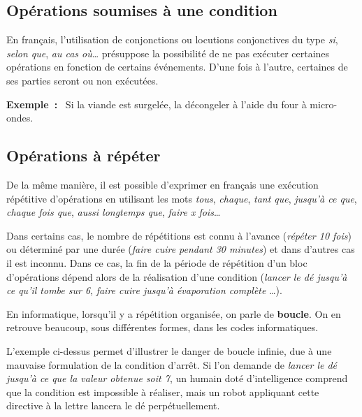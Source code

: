 		\subsection{Opérations soumises à une condition}
		
			En français, 
			l’utilisation de conjonctions ou locutions conjonctives 
			du type \textit{si}, \textit{selon que}, \textit{au cas où}\dots{}
			présuppose la possibilité 
			de ne pas exécuter certaines opérations 
			en fonction de certains événements. 
			D’une fois à l’autre, 
			certaines de ses parties seront ou non exécutées.
			
			\textbf{Exemple~:}~
			Si la viande est surgelée, 
			la décongeler à l’aide du four à micro-ondes.
	
		\subsection{Opérations à répéter}
		
			De la même manière, 
			il est possible d’exprimer en français une exécution
			répétitive d’opérations en utilisant les mots \textit{tous},
			\textit{chaque}, \textit{tant que}, \textit{jusqu’à ce que},
			\textit{chaque fois que}, \textit{aussi longtemps que}, 
			\textit{faire x fois}\dots 
			
			Dans certains cas, 
			le nombre de répétitions est connu à l’avance
			(\textit{répéter 10 fois}) 
			ou déterminé par une durée 
			(\textit{faire cuire pendant 30 minutes}) 
			et dans d’autres cas il est inconnu.
			Dans ce cas, la fin de la période de répétition 
			d’un bloc d’opérations dépend alors 
			de la réalisation d’une condition 
			(\textit{lancer le dé jusqu’à ce qu’il tombe sur 6}, 
			\textit{faire cuire jusqu’à évaporation complète} \dots). 
			
			En informatique, lorsqu'il y a répétition organisée, on parle de 
			\textbf{boucle}. On en retrouve beaucoup, sous différentes formes,
			dans les codes informatiques.
			
			L'exemple ci-dessus permet d'illustrer le danger de boucle infinie, 
			due à une mauvaise formulation de la condition d’arrêt.
			Si l'on demande de 
			\textit{lancer le dé jusqu’à ce que la valeur obtenue soit 7},
			un humain doté d’intelligence comprend 
			que la condition est impossible à réaliser, 
			mais un robot appliquant cette directive à la lettre 
			lancera le dé perpétuellement.
	
